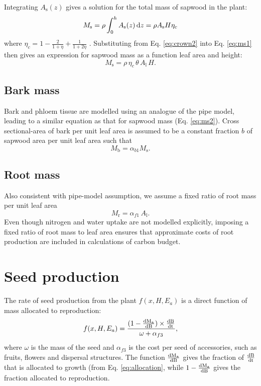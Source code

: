 \documentclass[10pt,twoside]{article}
\begin{document}
Integrating \(A_\textrm{s}(z)\) gives a solution for the total mass of
sapwood in the plant:
\begin{equation}\label{eq:ms1}
M_\textrm{s} = \rho \int_0^h  A_\textrm{s}(z) \, {\rm d}z = \rho  A_\textrm{s} H \eta_c
\end{equation}
where \(\eta_c = 1 - \frac{2}{1 + \eta} + \frac{1}{1 + 2\eta}\)
\citep{Yokozawa-1995}. Substituting from Eq. \ref{eq:crown2} into Eq.
\ref{eq:ms1} then gives an expression for sapwood mass as a function
leaf area and height:
\begin{equation}\label{eq:ms2}
M_\textrm{s} = \rho \, \eta_c \, \theta \, A_\textrm{l} \, H.
\end{equation}

\subsection{Bark mass}\label{bark-mass}

Bark and phloem tissue are modelled using an analogue of the pipe model,
leading to a similar equation as that for sapwood mass (Eq.
\ref{eq:ms2}). Cross sectional-area of bark per unit leaf area is
assumed to be a constant fraction \(b\) of sapwood area per unit leaf
area such that
\begin{equation}\label{eq:mb}
M_\textrm{b} = \alpha_{b1} M_\textrm{s}.
\end{equation}

\subsection{Root mass}\label{root-mass}

Also consistent with pipe-model assumption, we assume a fixed ratio of
root mass per unit leaf area
\begin{equation}\label{eq:mr}
M_\textrm{r} = \alpha_{f1} \, A_\textrm{l}.
\end{equation}
Even though nitrogen and water uptake are not modelled explicitly,
imposing a fixed ratio of root mass to leaf area ensures that
approximate costs of root production are included in calculations of
carbon budget.

\section{Seed production}\label{seed-production}

The rate of seed production from the plant \(f(x, H, E_a)\) is a direct
function of mass allocated to reproduction:
\begin{equation}\label{eq:fecundity}
f(x, H, E_a) = \frac{(1 - \frac{\rm{d}M_\textrm{a}}{\rm{d}B}) \times \frac{\rm{d}B}{\rm{d}t}}{
  \omega + \alpha_{f3}},
\end{equation}
where \(\omega\) is the mass of the seed and \(\alpha_{f3}\) is the cost
per seed of accessories, such as fruits, flowers and dispersal
structures. The function $\frac{\rm{d}M_\textrm{a}}{\rm{d}B}$ gives the fraction
of $\frac{\rm{d}B}{\rm{d}t}$ that is allocated to growth (from Eq. \ref{eq:allocation}, while
$1-\frac{\rm{d}M_\textrm{a}}{\rm{d}B}$ gives the fraction allocated
to reproduction.
\end{document}
